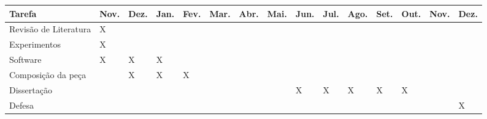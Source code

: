 \documentclass{article}
\begin{document}
\begin{table}[h]
  \centering
  \begin{tabular}{lllllllllllllll}
    \hline
    Tarefa & Nov. & Dez. & Jan. & Fev. & Mar. & Abr. & Mai. & Jun. & Jul. & Ago. & Set. &
    Out. & Nov. & Dez. \\
    \hline
    Revisão de Literatura & X &  &  & & & & & & & & & & & \\
    Experimentos & X &  &  & & & & & & & & & & & \\
    Software & X & X & X & & & & & & & & & & & \\
    Composição da peça & & X & X & X & & & & & & & & & & \\
    Dissertação & & & & & & & & X & X & X & X & X & & \\
    Defesa & & & & & & & & & & & & & & X \\
    \hline


    \hline
  \end{tabular}
  \label{tab:cronograma}
\end{table}


\renewcommand{\refname}{Bibliografia}

\nocite{adams1976mct,albrecht2004ect,alves05:_invar,alves2001cuc,batke2004edm,beard2003cmm,Blackburn2000thesis,buteau2005ama,buteau2003tmm,buteau1999mta,buteau2000csm,cambouropoulos2001mca,cambouropoulos2005pea,clifford1995cse,cook87:_techn_compar_analy,discipio2000ajc,dibben01:_motiv_struc_and_percep_of_simil,dowling1994mch,dowling1978sac,dowling1971rim,dowling1986mc,edworthy1985mca,forte83:_motiv_rhyth_contour_alto_rhaps,friedmann1987rmc,friedmann85:_method_discus_contour,ghias1995qhm,Hermann1995,hofmannengl1999vpa,ishiyama1996act,kim2000acb,kolinkski65:_struc_melod_movem,Li2004,lindsay1996ucm,logan2003tet,maidin:gam,marvin1988gtm,marvin87:_relat_music_contour,morris93:_new_direc_theor_analy_music_contour,morris1987cpc,AdamOckelford01012004,parsons1975dta,pauws2002cfo,polansky87mma,polansky92:_possib_impos_melod,prechelt2001imi,quinn2006mcp,quinn97:_fuzzy_exten_theor_contour,raju2002tam,raju2003tqh,ravenscroft2006rcc,music02:_melody,roy2004cbm,schmuckler1999tmm,schubert2006eih,schonberg1967fmc,seeger1960mml,serafine1989idm,sonoda2002bmr,Siu-LanTan04012004,toch1977sfm,toiviainen2002cmm,uitdenbogerd2003pre,weyde2005emr,yi1991tmc,zhu2002smc}



\end{document}
